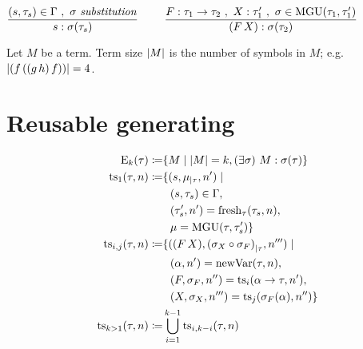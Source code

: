 \documentclass[a4paper,oneside]{memoir}
\begin{document}
~

$\dfrac{(s,\tau_s) \in \Gamma\ ,\ \sigma\ \mathit{substitution}}{s : \sigma(\tau_s)}$
~~~
$\dfrac{F : \tau_1 \rightarrow \tau_2\ ,\ X : \tau^\prime_1\ , \ \sigma \in \operatorname{MGU}(\tau_1,\tau^\prime_1)}{(F\,X) : \sigma(\tau_2)}$


\begin{definition}
Let $M$ be a term. Term size $\lvert M \rvert$ is the number of symbols in $M$; e.g. $\lvert (f\,((g\,h)\,f)) \rvert = 4$. 
\end{definition}

\newcommand{\inhab}[1]{\op{I}(#1)}

\newcommand{\tord}{\preccurlyeq}
\newcommand{\stord}{\prec}
\newcommand{\ordt}{\tord_\tau}
\newcommand{\tek}{\sim}
\newcommand{\ntek}{\nsim}
\newcommand{\ekt}{\tek_\tau}
\newcommand{\nekt}{\ntek_\tau}
\newcommand{\nsucct}{\nsucc_\tau}

\newcommand{\MGI}[1]{\op{MGI}(#1)}
\newcommand{\MGIt}{\MGI{\tau}}
\newcommand{\It}{\op{I}(\tau)}

\newcommand{\ids}{\sigma_{\op{id}}}

\newcommand{\U}[2]{\op{U}(#1,#2)}
\newcommand{\Utt}{\U{\tau}{\tauPr}}
\newcommand{\MGUtt}{\MGU{\tau}{\tauPr}}

\newcommand{\e}[2]{\op{E}_{#1}(#2)}
\newcommand{\restrict}[2]{{#1}_{\mid #2}}
\newcommand{\fresh}[2]{\op{fresh}_{#1}(#2)}
\newcommand{\newVar}[1]{\op{newVar}(#1)}
\newcommand{\Ss}[1]{\op{ss}(#1)}
\newcommand{\TS}[2]{\op{ts}_{#1}(#2)}
\newcommand{\ts}[2]{\op{ts}_{#1}(#2)}
\newcommand{\TSij}[3]{\op{ts}_{#1,#2}(#3)}
\newcommand{\trees}[2]{\op{trees}_{#1}(#2)}
\newcommand{\FX}{\ap{F}{X}}
\newcommand{\sF}{\s_{F}}
\newcommand{\sX}{\s_{X}}
\newcommand{\vars}[1]{\op{vars}(#1)}
\newcommand{\dom}[1]{\op{dom}(#1)}
\newcommand{\IH}{induction hypothesis\xspace}
\newcommand{\discup}{~\mathbin{\dot{\cup}}~}



\section{Reusable generating}

\begin{definition}
\begin{align*}
\e{k}{\tau} \defi& \{ M \mid \abs{M} = k, \E{\s}{ M : \s(\tau) } \} \\
\ts{1}{\tau,n} \defi&  \{ (s,\restrict{\mu}{\tau}, \nPr) \mid \\
 & ~~ (s,\tau_s) \in \Gamma, \\
 & ~~ (\tausPr,\nPr) = \fresh{\tau}{\tau_s, n}, \\
 & ~~ \mu = \mgu{\tau,\tausPr}
\} \\
\ts{i,j}{\tau,n} \defi& \{ (\FX, \restrict{(\sX \circ \sF)}{\tau}, \nPrrr) \mid \\ 
  & ~~ (\alpha, \nPr) = \newVar{\tau,n}, \\
  & ~~ (F,\sF,\nPrr) = \ts{i}{\alpha \ar \tau,\nPr}, \\
  & ~~ (X,\sX,\nPrrr) = \ts{j}{\sF(\alpha), \nPrr} 
\} \\
\ts{k > 1}{\tau,n} \defi& \bigcup\limits_{i=1}^{k-1}  \TSij{i}{k-i}{\tau, n}
\end{align*}
\end{definition}
\end{document}
